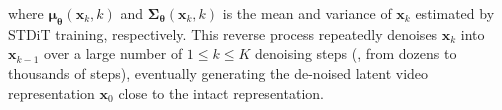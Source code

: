 \noindent where $\boldsymbol{\mu}_{\boldsymbol{\theta}} (\mathbf{x}_{k}, k)$ and $\boldsymbol{\Sigma}_{\boldsymbol{\theta}} (\mathbf{x}_{k}, k)$ is the mean and variance of $\mathbf{x}_{k}$ estimated by STDiT training, respectively. This reverse process repeatedly denoises $\mathbf{x}_{k}$ into $\mathbf{x}_{k-1}$ over a large number of $1 {\leq} k {\leq} K$ denoising steps (\ie, from dozens to thousands of steps), eventually generating the de-noised latent video representation $\mathbf{x}_0$ close to the intact representation.%







